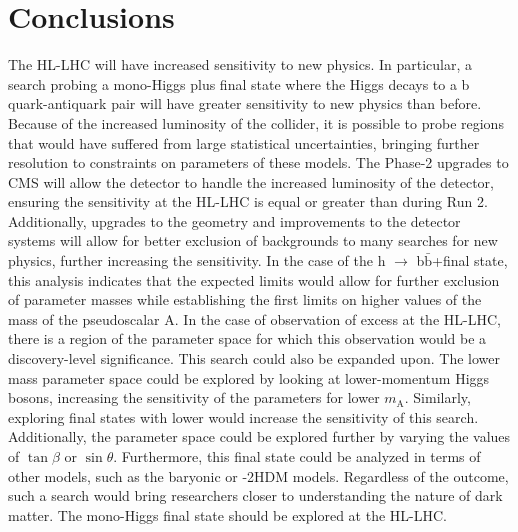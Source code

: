\section{Conclusions}
The HL-LHC will have increased sensitivity to new physics. In particular, a search probing a mono-Higgs plus \ptmiss final state where the Higgs decays to a b quark-antiquark pair will have greater sensitivity to new physics than before. Because of the increased luminosity of the collider, it is possible to probe regions that would have suffered from large statistical uncertainties, bringing further resolution to constraints on parameters of these models. The Phase-2 upgrades to CMS will allow the detector to handle the increased luminosity of the detector, ensuring the sensitivity at the HL-LHC is equal or greater than during Run 2. Additionally, upgrades to the geometry and improvements to the detector systems will allow for better exclusion of backgrounds to many searches for new physics, further increasing the sensitivity. In the case of the h $\to$ b$\bar{\mathrm{b}}$+\ptmiss final state, this analysis indicates that the expected limits would allow for further exclusion of parameter masses while establishing the first limits on higher values of the mass of the pseudoscalar A. In the case of observation of excess at the HL-LHC, there is a region of the parameter space for which this observation would be a discovery-level significance. This search could also be expanded upon. The lower mass parameter space could be explored by looking at lower-momentum Higgs bosons, increasing the sensitivity of the parameters for lower $m_\mathrm{A}$. Similarly, exploring final states with lower \ptmiss would increase the sensitivity of this search. Additionally, the parameter space could be explored further by varying the values of $\tan\beta$ or $\sin\theta$. Furthermore, this final state could be analyzed in terms of other models, such as the baryonic \Zp or \Zp-2HDM models. Regardless of the outcome, such a search would bring researchers closer to understanding the nature of dark matter. The mono-Higgs final state should be explored at the HL-LHC.